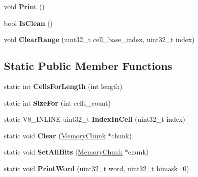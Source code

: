 \begin{DoxyCompactItemize}
\item 
void {\bfseries Print} ()\hypertarget{classv8_1_1internal_1_1_bitmap_a62cecf8d8ab89f87fc4db5555b10b6b0}{}\label{classv8_1_1internal_1_1_bitmap_a62cecf8d8ab89f87fc4db5555b10b6b0}

\item 
bool {\bfseries Is\+Clean} ()\hypertarget{classv8_1_1internal_1_1_bitmap_adcc903a3d3788b077a87977dc06122ff}{}\label{classv8_1_1internal_1_1_bitmap_adcc903a3d3788b077a87977dc06122ff}

\item 
void {\bfseries Clear\+Range} (uint32\+\_\+t cell\+\_\+base\+\_\+index, uint32\+\_\+t index)\hypertarget{classv8_1_1internal_1_1_bitmap_a44d511460835ee588358cc0e7bbfb09e}{}\label{classv8_1_1internal_1_1_bitmap_a44d511460835ee588358cc0e7bbfb09e}

\end{DoxyCompactItemize}
\subsection*{Static Public Member Functions}
\begin{DoxyCompactItemize}
\item 
static int {\bfseries Cells\+For\+Length} (int length)\hypertarget{classv8_1_1internal_1_1_bitmap_ad66f6785ba1628091c2b57b00b039d28}{}\label{classv8_1_1internal_1_1_bitmap_ad66f6785ba1628091c2b57b00b039d28}

\item 
static int {\bfseries Size\+For} (int cells\+\_\+count)\hypertarget{classv8_1_1internal_1_1_bitmap_acb5b3a62207cb6a9d98bd932d539b171}{}\label{classv8_1_1internal_1_1_bitmap_acb5b3a62207cb6a9d98bd932d539b171}

\item 
static V8\+\_\+\+I\+N\+L\+I\+NE uint32\+\_\+t {\bfseries Index\+In\+Cell} (uint32\+\_\+t index)\hypertarget{classv8_1_1internal_1_1_bitmap_aa252ce8d3b20887e35681a1b299d58db}{}\label{classv8_1_1internal_1_1_bitmap_aa252ce8d3b20887e35681a1b299d58db}

\item 
static void {\bfseries Clear} (\hyperlink{classv8_1_1internal_1_1_memory_chunk}{Memory\+Chunk} $\ast$chunk)\hypertarget{classv8_1_1internal_1_1_bitmap_ad36b4f298f747f2519508bbb6bde884c}{}\label{classv8_1_1internal_1_1_bitmap_ad36b4f298f747f2519508bbb6bde884c}

\item 
static void {\bfseries Set\+All\+Bits} (\hyperlink{classv8_1_1internal_1_1_memory_chunk}{Memory\+Chunk} $\ast$chunk)\hypertarget{classv8_1_1internal_1_1_bitmap_a96d5149993388f60834a0e5c55bd360f}{}\label{classv8_1_1internal_1_1_bitmap_a96d5149993388f60834a0e5c55bd360f}

\item 
static void {\bfseries Print\+Word} (uint32\+\_\+t word, uint32\+\_\+t himask=0)\hypertarget{classv8_1_1internal_1_1_bitmap_a17e5795fbb9cd31a552594c987863390}{}\label{classv8_1_1internal_1_1_bitmap_a17e5795fbb9cd31a552594c987863390}

\end{DoxyCompactItemize}
